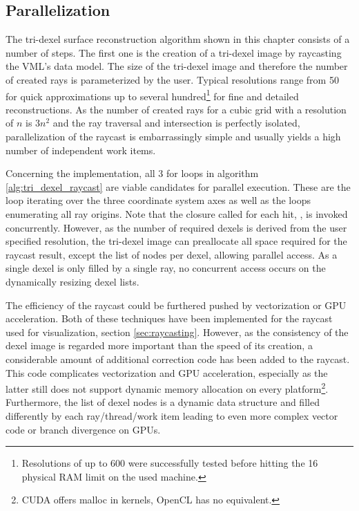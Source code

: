\subsection{Parallelization}
\label{sec:tri_dexel_parallelization}

The tri-dexel surface reconstruction algorithm shown in this chapter consists of a number of steps.
The first one is the creation of a tri-dexel image by raycasting the VML's data model.
The size of the tri-dexel image and therefore the number of created rays is parameterized by the user.
Typical resolutions range from 50 for quick approximations up to several hundred\footnote{Resolutions of up to 600 were successfully tested before hitting the \SI{16}{\gibi\byte} physical RAM limit on the used machine.} for fine and detailed reconstructions.
As the number of created rays for a cubic grid with a resolution of $n$ is $3n^2$ and the ray traversal and intersection is perfectly isolated, parallelization of the raycast is embarrassingly simple and usually yields a high number of independent work items.

Concerning the implementation, all 3 for loops in algorithm \ref{alg:tri_dexel_raycast} are viable candidates for parallel execution.
These are the loop iterating over the three coordinate system axes as well as the loops enumerating all ray origins.
Note that the closure called for each hit, , is invoked concurrently.
However, as the number of required dexels is derived from the user specified resolution, the tri-dexel image can preallocate all space required for the raycast result, except the list of nodes per dexel, allowing parallel access.
As a single dexel is only filled by a single ray, no concurrent access occurs on the dynamically resizing dexel lists.

The efficiency of the raycast could be furthered pushed by vectorization or GPU acceleration.
Both of these techniques have been implemented for the raycast used for visualization, \cf section \ref{sec:raycasting}.
However, as the consistency of the dexel image is regarded more important than the speed of its creation, a considerable amount of additional correction code has been added to the raycast.
This code complicates vectorization and GPU acceleration, especially as the latter still does not support dynamic memory allocation on every platform\footnote{CUDA offers malloc in kernels, OpenCL has no equivalent.}.
Furthermore, the list of dexel nodes is a dynamic data structure and filled differently by each ray/thread/work item leading to even more complex vector code or branch divergence on GPUs.

